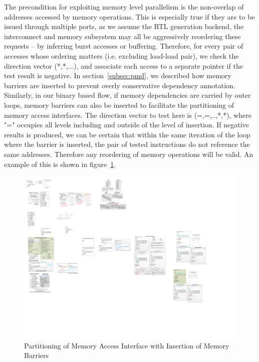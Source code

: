 The precondition for exploiting memory level parallelism is the non-overlap of addresses accessed by memory operations. This is especially true if they are to be issued through multiple ports, 
as we assume the RTL generation backend, the interconnect and memory subsystem may all be aggressively reordering these requests -- by inferring burst accesses or buffering.
Therefore, for every pair of accesses whose ordering matters (i.e. excluding load-load pair), we check the direction vector (*,*,...), and associate each access to a separate
pointer if the test result is negative. In section~\ref{subsec:pmd}, we described how memory barriers are inserted to prevent overly conservative dependency annotation.
Similarly, in our binary based flow, if memory dependencies are carried by outer loops,
memory barriers can also be inserted to facilitate the partitioning of memory access interfaces. The direction vector to test here is  (=,=,..,*,*),
where "=" occupies all levels including and outside of the level of insertion. If negative results is produced, we can be certain that within the same iteration of the loop where the barrier is inserted, the pair of tested instructions do not reference the same addresses.
Therefore any reordering of memory operations will be valid. An example of this is shown in figure~\ref{fig:withOrWithoutBarrier}. 


\begin{figure}[htp]
\begin{center}
\includegraphics[width=0.9\linewidth]{chap6fig/memOrMemBarrier2.pdf}
\caption{Partitioning of Memory Access Interface with Insertion of Memory Barriers 
\label{fig:withOrWithoutBarrier}}
\end{center}
\end{figure}


